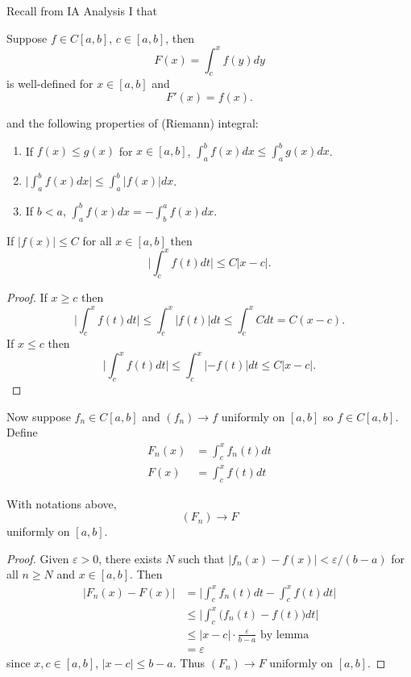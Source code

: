 \documentclass[a4paper]{article}
\theoremstyle{definition}
\begin{document}
Recall from IA Analysis I that
\begin{theorem}
  \label{thm:FTC}
  Suppose \(f\in C[a,b]\), \(c\in [a,b]\), then
  \[
    F(x) = \int_{c}^{x} f(y) dy
  \]
  is well-defined for \(x\in[a,b]\) and
  \[
    F'(x) = f(x).
  \]
\end{theorem}
and the following properties of (Riemann) integral:
\begin{enumerate}
\item If \(f(x) \leq g(x) \) for \(x\in[a,b]\), \(\int_{a}^{b} f(x) dx \leq \int_{a}^{b} g(x) dx \).
\item \(\big|\int_{a}^{b} f(x) dx \big| \leq \int_{a}^{b} |f(x)| dx \).
\item If \(b<a\), \(\int_{a}^{b} f(x) dx = - \int_{b}^{a} f(x) dx \).
\end{enumerate}

\begin{lemma}
  If \(|f(x)|\leq C\) for all \(x\in[a,b]\) then
  \[
    \Big| \int_{c}^{x} f(t) dt \Big| \leq C|x-c|.
  \]
\end{lemma}

\begin{proof}
  If \(x\geq c\) then
  \[
    \Big| \int_{c}^{x} f(t) dt \Big| \leq \int_{c}^{x} |f(t)| dt \leq \int_{c}^{x} C dt = C(x-c).
  \]
  If \(x\leq c\) then
   \[
    \Big| \int_{c}^{x} f(t) dt \Big| \leq \int_{c}^{x} |-f(t)| dt \leq C|x-c|.
  \]
\end{proof}

Now suppose \(f_n\in C[a,b]\) and \((f_n)\to f\) uniformly on \([a,b]\) so \(f\in C[a,b]\). Define
\begin{align*}
  F_n(x) &= \int_{c}^{x} f_n(t) dt \\
  F(x) &= \int_{c}^{x} f(t) dt
\end{align*}

\begin{proposition}
  \label{prop:power series integral convergence}
  With notations above,
  \[
    (F_n) \to F
  \]
  uniformly on \([a,b]\).
\end{proposition}

\begin{proof}
  Given \(\varepsilon>0\), there exists \(N\) such that \(|f_n(x) - f(x)| < \varepsilon/(b-a)\) for all \(n\geq N\) and \(x\in[a,b]\). Then
  \begin{align*}
    |F_n(x) - F(x)| &= \Big| \int_{c}^{x} f_n(t) dt - \int_{c}^{x} f(t) dt \Big| \\
                    &\leq \Big| \int_{c}^{x} \big( f_n(t) - f(t) \big) dt \Big| \\
                    &\leq |x-c| \cdot\frac{\varepsilon}{b-a} \text{ by lemma} \\
                    &= \varepsilon
  \end{align*}
  since \(x,c\in[a,b]\), \(|x-c|\leq b-a\). Thus \((F_n)\to F\) uniformly on \([a,b]\).
\end{proof}
\end{document}
